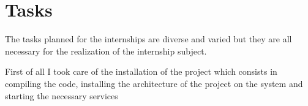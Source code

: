 \section{Tasks}
The tasks planned for the internships are diverse and varied but they
are all necessary for the realization of the internship subject.

First of all I took care of the installation of the project which 
consists in compiling the code, installing the architecture of the
project on the system and starting the necessary services